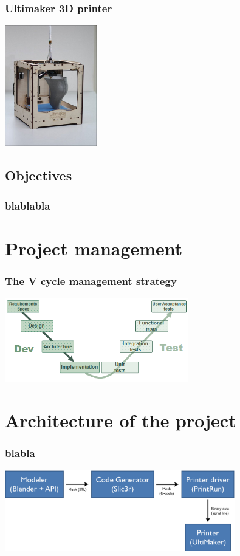 \documentclass{beamer}
\begin{document}
\begin{frame}
	\frametitle{Ultimaker 3D printer}

    \begin{center}
		\includegraphics[width=4cm]{Ultimaker}	
	\end{center}
    
\end{frame}

\subsection{Objectives}
\begin{frame}
	\frametitle{blablabla}
    
\end{frame}

\section{Project management}
\begin{frame}
	\frametitle{The V cycle management strategy}

    \begin{center}
		\includegraphics[width=8cm]{VCycle}	
	\end{center}
\end{frame}

\section{Architecture of the project}
\begin{frame}
	\frametitle{blabla}

    \begin{center}
		\includegraphics[width=10cm]{schema}	
	\end{center}
	
\end{frame}
\end{document}
